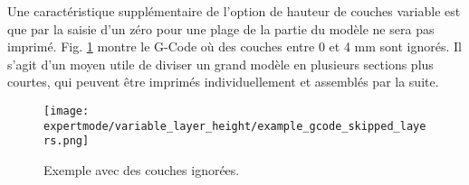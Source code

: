 Une caract\'eristique suppl\'ementaire de l'option de hauteur de couches variable est que par la saisie d'un z\'ero pour une plage de la partie du mod\`ele ne sera pas imprim\'e.  Fig. \ref{fig:example_gcode_skipped_layers} montre le G-Code o\`u des couches entre 0 et 4 mm sont ignor\'es. Il s'agit d'un moyen utile de diviser un grand mod\`ele en plusieurs sections plus courtes, qui peuvent \^etre imprim\'es individuellement et assembl\'es par la suite.
\begin{figure}[H]
\centering
\texttt{[image: expertmode/variable\_layer\_height/example\_gcode\_skipped\_layers.png]}
\caption{Exemple avec des couches ignor\'ees.}
\label{fig:example_gcode_skipped_layers}
\end{figure}

